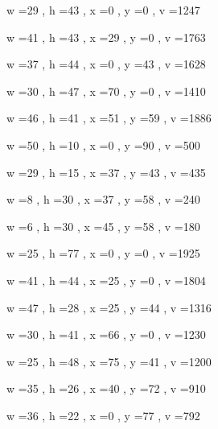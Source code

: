 \documentclass[11pt]{article}
\begin{document}
w =29 , h =43 , x =0 , y =0 , v =1247
\par
w =41 , h =43 , x =29 , y =0 , v =1763
\par
w =37 , h =44 , x =0 , y =43 , v =1628
\par
w =30 , h =47 , x =70 , y =0 , v =1410
\par
w =46 , h =41 , x =51 , y =59 , v =1886
\par
w =50 , h =10 , x =0 , y =90 , v =500
\par
w =29 , h =15 , x =37 , y =43 , v =435
\par
w =8 , h =30 , x =37 , y =58 , v =240
\par
w =6 , h =30 , x =45 , y =58 , v =180
\par
\newpage




w =25 , h =77 , x =0 , y =0 , v =1925
\par
w =41 , h =44 , x =25 , y =0 , v =1804
\par
w =47 , h =28 , x =25 , y =44 , v =1316
\par
w =30 , h =41 , x =66 , y =0 , v =1230
\par
w =25 , h =48 , x =75 , y =41 , v =1200
\par
w =35 , h =26 , x =40 , y =72 , v =910
\par
w =36 , h =22 , x =0 , y =77 , v =792
\par
\newpage
\end{document}
